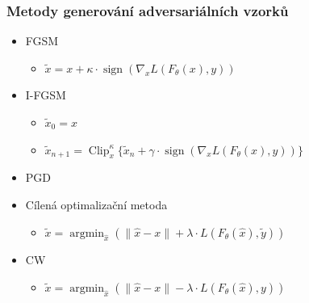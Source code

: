 \documentclass[czech]{beamer}
\begin{document}
\begin{frame}
    \frametitle{Metody generování adversariálních vzorků}
    \begin{itemize}
        \item FGSM
        \begin{itemize}
            \item $\tilde{x} = x + \kappa \cdot \operatorname{sign} \left( \nabla_x L(F_\theta(x), y) \right)$
        \end{itemize}
        \item I-FGSM
        \begin{itemize}
            \item $\tilde{x}_0 = x$
            \item $\tilde{x}_{n+1} = \operatorname{Clip}_x^\kappa \{\tilde{x}_n + \gamma \cdot \operatorname{sign}(\nabla_x L(F_{\theta}(x), y))\}$
        \end{itemize}
        \item PGD
        \item Cílená optimalizační metoda
        \begin{itemize}
            \item $\tilde{x} = \operatorname{argmin}_{\hat{x}} \left( \|\hat{x} - x\|
            + \lambda \cdot L(F_{\theta}(\hat{x}), \tilde{y}) \right)$
        \end{itemize}
        \item CW
        \begin{itemize}
            \item $\tilde{x} = \operatorname{argmin}_{\hat{x}} \left(\|\hat{x} - x\|
            - \lambda \cdot L(F_{\theta}(\hat{x}), y) \right)$
        \end{itemize}
    \end{itemize}
    

    
\end{frame}
\end{document}
